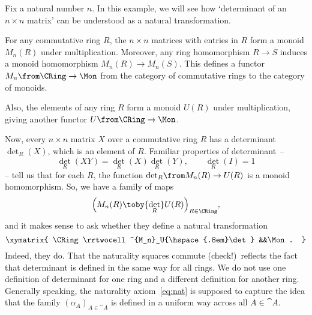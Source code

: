 \begin{example}
Fix a natural number $n$.  In this example, we will see how `determinant%
%
%
of an $n \times n$ matrix' can be understood as a natural transformation.

For any commutative ring $R$, the $n \times n$ matrices with entries in $R$
form a monoid $M_n(R)$ under multiplication.  Moreover, any ring
homomorphism $R \to S$ induces a monoid homomorphism $M_n(R) \to M_n(S)$.
This defines a functor $M_n\from \CRing \to \Mon$ from the category of
commutative rings to the category of monoids.

Also, the elements of any ring $R$ form a monoid $U(R)$ under multiplication,
giving another functor $U\from \CRing \to \Mon$.

Now, every $n \times n$ matrix $X$ over a commutative ring $R$
has a determinant ${\det}_R(X)$, which is an element of $R$.
Familiar properties of determinant~--
\[
{\det}_R(XY) = {\det}_R(X) {\det}_R(Y),
\qquad
{\det}_R(I) = 1
\]
-- tell us that for each $R$, the function ${\det}_R\from M_n(R) \to U(R)$
is a monoid homomorphism.  So, we have a family of maps
\[
\Bigl( M_n(R) \toby{\det_R} U(R) \Bigr)_{R \in \CRing},
\]
and it makes sense to ask whether they define a natural transformation
\[
\xymatrix{
\CRing \rrtwocell^{M_n}_U{\hspace{.8em}\det} &&\Mon.
}
\]
Indeed, they do.  That the naturality squares commute (check!)\ reflects
the fact that determinant is defined in the same way for all rings.  We do
not use one definition of determinant for one ring and a different
definition for another ring.  Generally speaking, the naturality
axiom~\eqref{eq:nat} is supposed to capture the idea that the family
$(\alpha_A)_{A \in \cat{A}}$ is defined in a uniform way across all $A \in
\cat{A}$.
\end{example}

